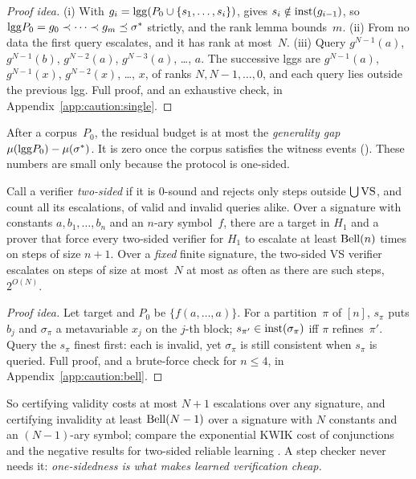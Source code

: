 \begin{proof}[Proof idea]
(i) With $g_i=\mathrm{lgg}(P_0\cup\{s_1,\dots,s_i\})$,  gives $s_i\notin\mathrm{inst}(g_{i-1})$, so $\mathrm{lgg} P_0=g_0\prec\dots\prec g_m\preceq\sigma^*$ strictly, and the rank lemma bounds~$m$. (ii) From no data the first query escalates, and it has rank at most~$N$. (iii) Query $g^{N-1}(a)$, $g^{N-1}(b)$, $g^{N-2}(a)$, $g^{N-3}(a)$, \dots, $a$. The successive lggs are $g^{N-1}(a)$, $g^{N-1}(x)$, $g^{N-2}(x)$, \dots, $x$, of ranks $N,N-1,\dots,0$, and each query lies outside the previous lgg. Full proof, and an exhaustive check, in Appendix~\ref{app:caution:single}.
\end{proof}

After a corpus~$P_0$, the residual budget is at most the \emph{generality gap} $\mu(\mathrm{lgg} P_0)-\mu(\sigma^*)$. It is zero once the corpus satisfies the witness events (). These numbers are small only because the protocol is one-sided.

\begin{proposition}\label{prop:caution:bell}
Call a verifier \emph{two-sided} if it is $0$-sound and rejects only steps outside $\bigcup\mathrm{VS}$, and count all its escalations, of valid and invalid queries alike.
Over a signature with constants $a,b_1,\dots,b_n$ and an $n$-ary symbol~$f$, there are a target in $H_1$ and a prover that force every two-sided verifier for $H_1$ to escalate at least $\mathrm{Bell}(n)$ times on steps of size $n+1$. Over a \emph{fixed} finite signature, the two-sided VS verifier escalates on steps of size at most~$N$ at most as often as there are such steps, $2^{O(N)}$.
\end{proposition}

\begin{proof}[Proof idea]
Let target and $P_0$ be $\{f(a,\dots,a)\}$. For a partition~$\pi$ of $[n]$, $s_\pi$ puts $b_j$ and $\sigma_\pi$ a metavariable $x_j$ on the $j$-th block; $s_{\pi'}\in\mathrm{inst}(\sigma_\pi)$ iff $\pi$ refines~$\pi'$. Query the $s_\pi$ finest first: each is invalid, yet $\sigma_\pi$ is still consistent when $s_\pi$ is queried. Full proof, and a brute-force check for $n\le4$, in Appendix~\ref{app:caution:bell}.
\end{proof}

So certifying validity costs at most $N+1$ escalations over any signature, and certifying invalidity at least $\mathrm{Bell}(N-1)$ over a signature with $N$ constants and an $(N-1)$-ary symbol; compare the exponential KWIK cost of conjunctions \citep{li2011knows} and the negative results for two-sided reliable learning \citep{kivinen1995learning}. A step checker never needs it: \emph{one-sidedness is what makes learned verification cheap.}

